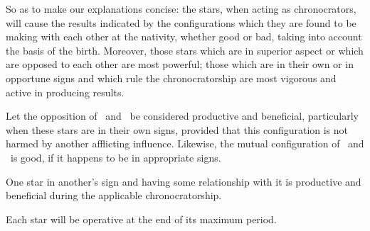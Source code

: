 So \mndl as to make our explanations concise: the stars, when acting as chronocrators, will cause the results indicated by the configurations which they are found to be making with each other at the nativity, whether good or bad, taking into account the basis of the birth. Moreover, those stars which are in superior aspect or which are opposed to each other are most powerful; those which are in their own or in opportune signs and which rule the chronocratorship are most vigorous and active in producing results. 

 
Let the opposition of \Saturn\, and \Jupiter\, be considered productive and beneficial, particularly when these stars are in their own
signs, provided that this configuration is not harmed by another afflicting influence. Likewise, the mutual configuration of \Jupiter\, and \Mars\, is good, if it happens to be in appropriate signs. 

One star in another’s sign and having some relationship with it is productive and beneficial during the applicable chronocratorship. 

Each star will be operative at the end of its maximum period.

\newpage